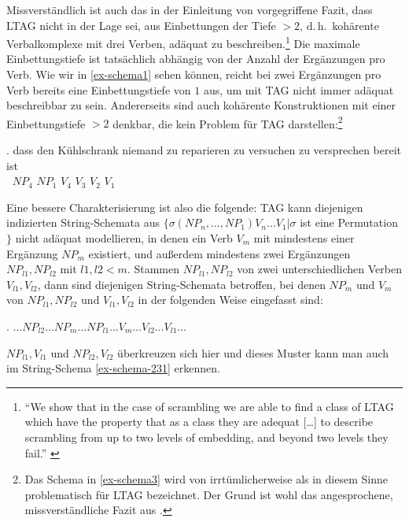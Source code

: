 \newpage
Missverständlich ist auch das in der Einleitung von \cite{Joshi:Becker:Rambow:00} vorgegriffene Fazit, dass LTAG nicht in der Lage sei,  aus Einbettungen der Tiefe $>2$, d.\,h.\ kohärente Verbalkomplexe mit drei Verben, adäquat zu beschreiben.\footnote{"`We show that in the case of scrambling we are able to find a class of LTAG which have the property that as a class they are adequat [\ldots] to describe scrambling from up to two levels of embedding, and beyond two levels they fail."' \citep[167]{Joshi:Becker:Rambow:00}} Die maximale Einbettungstiefe ist tatsächlich abhängig von der Anzahl der Ergänzungen pro Verb. Wie wir in \ref{ex-schema1} sehen können, reicht bei zwei Ergänzungen pro Verb bereits eine Einbettungstiefe von $1$ aus, um mit TAG nicht immer adäquat beschreibbar zu sein. Andererseits sind auch kohärente Konstruktionen mit einer Einbettungstiefe $>2$ denkbar, die kein Problem für TAG darstellen:\footnote{Das Schema in \ref{ex-schema3} wird von \citet[190]{Kallmeyer:05} irrtümlicherweise als in diesem Sinne problematisch für LTAG bezeichnet. Der Grund ist wohl das angesprochene, missverständliche Fazit aus \citet[167]{Joshi:Becker:Rambow:00}.} 

\exg. dass {den Kühlschrank} niemand {zu reparieren} {zu versuchen} {zu versprechen} {bereit ist} \\
$~$ $\mathit{NP}_4$ $\mathit{NP}_1$ $V_4$ $V_3$ $V_2$ $V_1$ \\
\label{ex-schema3} 

Eine bessere Charakterisierung ist also die folgende: TAG kann diejenigen indizierten String-Schemata aus $\{ \sigma(\mathit{NP}_n, \ldots, \mathit{NP}_1) V_n \ldots V_1 | \sigma$ ist eine Permutation $\}$ nicht adäquat modellieren, in denen ein Verb $V_m$ mit mindestens einer Ergänzung $\mathit{NP}_m$ existiert, und au\ss erdem mindestens zwei Ergänzungen $\mathit{NP}_{l1}, \mathit{NP}_{l2}$ mit $l1,l2 < m$. Stammen $\mathit{NP}_{l1}, \mathit{NP}_{l2}$ von zwei unterschiedlichen Verben $V_{l1}, V_{l2}$, dann sind diejenigen String-Schemata betroffen, bei denen $\mathit{NP}_m$ und $V_m$ von $\mathit{NP}_{l1}, \mathit{NP}_{l2}$ und $V_{l1}, V_{l2}$ in der folgenden Weise eingefasst sind: 

\ex. $\ldots \mathit{NP}_{l2} \ldots \mathit{NP}_m \ldots \mathit{NP}_{l1} \ldots V_m \ldots V_{l2} \ldots V_{l1} \ldots$\label{ex-schema-abstrakt} 

$\mathit{NP}_{l1}, V_{l1}$ und $\mathit{NP}_{l2}, V_{l2}$ überkreuzen sich hier und dieses Muster kann man auch im String-Schema \ref{ex-schema-231} erkennen. 


